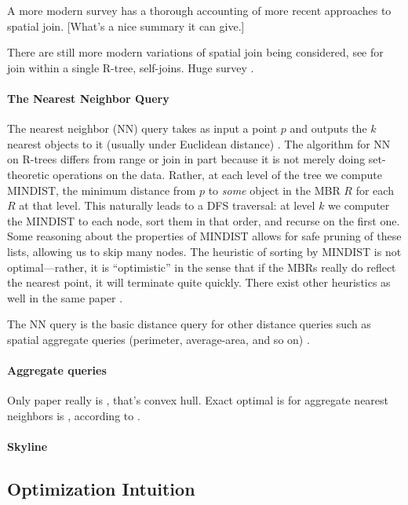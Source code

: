 A more modern survey \cite{jacoxsamet07} has a thorough accounting of more recent approaches to spatial join.
[What's a nice summary it can give.]

There are still more modern variations of spatial join being considered, see \cite{vassilakopouloscorralkaranikolas11} for join within a single R-tree, self-joins.
Huge survey \cite{jacoxsamet07}.

\paragraph{The Nearest Neighbor Query}
The nearest neighbor (NN) query takes as input a point $p$ and outputs the $k$ nearest objects to it (usually under Euclidean distance) \cite{roussopouloskelleyvincent95}.
The algorithm for NN on R-trees differs from range or join in part because it is not merely doing set-theoretic operations on the data. 
Rather, at each level of the tree we compute MINDIST, the minimum distance from $p$ to \emph{some} object in the MBR $R$ for each $R$ at that level.
This naturally leads to a DFS traversal: at level $k$ we computer the MINDIST to each node, sort them in that order, and recurse on the first one.
Some reasoning about the properties of MINDIST allows for safe pruning of these lists, allowing us to skip many nodes.
The heuristic of sorting by MINDIST is not optimal---rather, it is ``optimistic'' in the sense that if the MBRs really do reflect the nearest point, it will terminate quite quickly.
There exist other heuristics as well in the same paper \cite{roussopouloskelleyvincent95}.

The NN query is the basic distance query for other distance queries such as spatial aggregate queries (perimeter, average-area, and so on) \cite{corralalmendros-jimenez07}.

\paragraph{Aggregate queries}
Only paper really is \cite{bohmkriegel01}, that's convex hull.
Exact optimal is for aggregate nearest neighbors is \cite{papadiastaomouratidishui05}, according to \cite{liliyiyaowang11}.
 
\paragraph{Skyline}

\subsection{Optimization Intuition}

